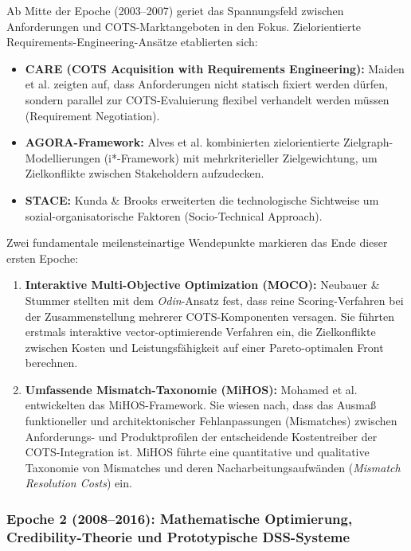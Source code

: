 Ab Mitte der Epoche (2003--2007) geriet das Spannungsfeld zwischen Anforderungen und COTS-Marktangeboten in den Fokus. Zielorientierte Requirements-Engineering-Ansätze etablierten sich:
\begin{itemize}
    \item \textbf{CARE (COTS Acquisition with Requirements Engineering):} Maiden et al. \cite{TLB687YL, 6RNULWVY} zeigten auf, dass Anforderungen nicht statisch fixiert werden dürfen, sondern parallel zur COTS-Evaluierung flexibel verhandelt werden müssen (Requirement Negotiation).
    \item \textbf{AGORA-Framework:} Alves et al. \cite{8XNYS4M9} kombinierten zielorientierte Zielgraph-Modellierungen (i*-Framework) mit mehrkriterieller Zielgewichtung, um Zielkonflikte zwischen Stakeholdern aufzudecken.
    \item \textbf{STACE:} Kunda \& Brooks \cite{QDUNCXFC} erweiterten die technologische Sichtweise um sozial-organisatorische Faktoren (Socio-Technical Approach).
\end{itemize}

Zwei fundamentale meilensteinartige Wendepunkte markieren das Ende dieser ersten Epoche:
\begin{enumerate}
    \item \textbf{Interaktive Multi-Objective Optimization (MOCO):} Neubauer \& Stummer \cite{ZQMG69VT} stellten mit dem \textit{Odin}-Ansatz fest, dass reine Scoring-Verfahren bei der Zusammenstellung mehrerer COTS-Komponenten versagen. Sie führten erstmals interaktive vector-optimierende Verfahren ein, die Zielkonflikte zwischen Kosten und Leistungsfähigkeit auf einer Pareto-optimalen Front berechnen.
    \item \textbf{Umfassende Mismatch-Taxonomie (MiHOS):} Mohamed et al. \cite{MC9UMXZZ, 9F79VAAB} entwickelten das MiHOS-Framework. Sie wiesen nach, dass das Ausmaß funktioneller und architektonischer Fehlanpassungen (Mismatches) zwischen Anforderungs- und Produktprofilen der entscheidende Kostentreiber der COTS-Integration ist. MiHOS führte eine quantitative und qualitative Taxonomie von Mismatches und deren Nacharbeitungsaufwänden (\textit{Mismatch Resolution Costs}) ein.
\end{enumerate}

\subsubsection{Epoche 2 (2008--2016): Mathematische Optimierung, Credibility-Theorie und Prototypische DSS-Systeme}


